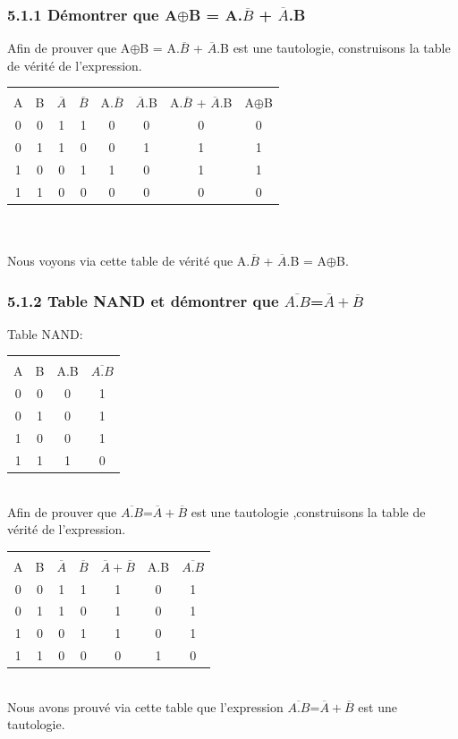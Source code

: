 \documentclass{report}
\begin{document}
\subsubsection*{5.1.1 Démontrer que A$\oplus$B = A.$\overline{B}$ + $\overline{A}$.B}
\hspace*{1,5cm} Afin de prouver que A$\oplus$B = A.$\overline{B}$ + $\overline{A}$.B est une tautologie, construisons la table de v\'erit\'e de l'expression.\\
\begin{tabular}{|c|c|c|c|c|c|c|c|}
\hline
 & & & & & & & \\ 
A & B & $\overline{A}$ & $\overline{B}$ & A.$\overline{B}$ & $\overline{A}$.B & A.$\overline{B}$ + $\overline{A}$.B & A$\oplus$B \\
\hline
0&0&1&1&0&0&0&0\\
0&1&1&0&0&1&1&1\\
1&0&0&1&1&0&1&1\\
1&1&0&0&0&0&0&0\\
\hline
\end{tabular}\\
\\
\hspace*{1,5cm} Nous voyons via cette table de v\'erit\'e que A.$\overline{B}$ + $\overline{A}$.B = A$\oplus$B.\\
\subsubsection*{5.1.2 Table NAND et démontrer que $\overline{A.B}$=$\overline{A}+\overline{B}$}
Table NAND: \\
\begin{tabular}{|c|c|c|c|}
\hline
  & & & \\
 A & B & A.B & $\overline{A.B}$\\
\hline
 0 & 0 & 0 & 1\\
 0 & 1 & 0 & 1\\
 1 & 0 & 0 & 1\\
 1 & 1 & 1 & 0 \\
 \hline
\end{tabular} \\

\hspace*{1,5cm}Afin de prouver que $\overline{A.B}$=$\overline{A}+\overline{B}$ est une tautologie ,construisons la table de v\'erit\'e de l'expression.\\

\begin{tabular}{|c|c|c|c|c|c|c|}
\hline
 & & & & & & \\
 A & B & $\overline{A}$ & $\overline{B}$ & $\overline{A}+\overline{B}$ & A.B & $\overline{A.B}$\\
 \hline
 0&0&1&1&1&0&1\\
 0&1&1&0&1&0&1\\
 1&0&0&1&1&0&1\\
 1&1&0&0&0&1&0\\
 \hline
\end{tabular}\\
\hspace*{1,5cm} Nous avons prouv\'e via cette table que l'expression $\overline{A.B}$=$\overline{A}+\overline{B}$ est une tautologie.\\
\newpage
\end{document}
